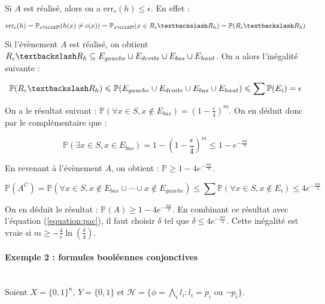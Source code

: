 \documentclass{article}
\newcommand{\err}{\text{err}}
\begin{document}
Si $A$ est réalisé, alors on a $\err_c(h) \leqslant \epsilon$. En effet :

\begin{equation*}
  \err_c(h) = \mathbb{P}_{x \tild \mathcal{D}} (h(x) \ne c(x)) = \mathbb{P}_{x \tild \mathcal{D}}(x \in R_c \textbackslash R_h) = \mathbb{P}(R_c \textbackslash R_h)
\end{equation*}

Si l'évènement $A$ est réalisé, on obtient $R_c \textbackslash R_h \subseteq E_{gauche} \cup E_{droite} \cup E_{bas} \cup E_{haut}$. On a alors l'inégalité suivante :

\begin{equation*}
  \mathbb{P}(R_c \textbackslash R_h) \leqslant \mathbb{P}(E_{gauche} \cup E_{droite} \cup E_{bas} \cup E_{haut}) \leqslant \sum \mathbb{P}(E_i) = \epsilon
\end{equation*}

On a le résultat suivant : $\mathbb{P}(\forall x \in S, x \notin E_{bas}) = (1 - \frac{\epsilon}{4})^m$. On en déduit donc par le complémentaire que :

\begin{equation*}
  \mathbb{P}(\exists x \in S, x \in E_{bas}) = 1 - (1 - \frac{\epsilon}{4})^m \leqslant 1 - e^{-\frac{m\epsilon}{4}}
\end{equation*}

En revenant à l'évènement $A$, on obtient : $\mathbb{P} \geqslant 1 - 4e^{-\frac{m\epsilon}{4}}$.

\begin{equation*}
  \mathbb{P}(A^C) = \mathbb{P}(\forall x \in S, x \notin E_{bas} \cup \cdots \cup x \notin E_{gauche}) \leqslant \sum \mathbb{P}(\forall x \in S, x \notin E_i) \leqslant 4e^{-\frac{m\epsilon}{4}}
\end{equation*}

On en déduit le résultat : $\mathbb{P}(A) \geqslant 1 - 4e^{-\frac{m\epsilon}{4}}$. En combinant ce résultat avec l'équation (\ref{equation:pac}), il faut choisir $\delta$ tel que $\delta \leqslant 4e^{-\frac{m\epsilon}{4}}$. Cette inégalité est vraie si $\boxed{m \geqslant -\frac{4}{\epsilon} \ln (\frac{\delta}{4})}$.

\paragraph{Exemple 2 : formules booléennes conjonctives}~\\

Soient $X = \{0, 1\}^n$, $Y = \{0, 1\}$ et $\mathcal{H} = \{\phi = \bigwedge_{i} l_i : l_i = p_i \text{ ou } \neg p_i \}$.
\end{document}

